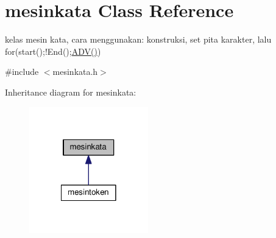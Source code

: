 \hypertarget{classmesinkata}{\section{mesinkata Class Reference}
\label{classmesinkata}
}


kelas mesin kata, cara menggunakan\-: konstruksi, set pita karakter, lalu for(start();!\-End();\hyperlink{classmesinkata_aa9d334f1b013d6e2f23f791346561e76}{A\-D\-V()})  




{\ttfamily \#include $<$mesinkata.\-h$>$}



Inheritance diagram for mesinkata\-:\nopagebreak
\begin{figure}[H]
\begin{center}
\leavevmode
\includegraphics[width=146pt]{classmesinkata__inherit__graph}
\end{center}
\end{figure}
